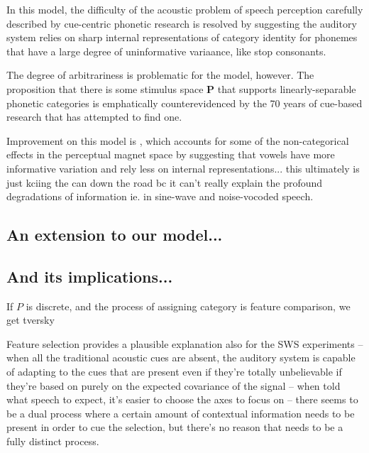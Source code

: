 \begin{multicols}{2}
In this model, the difficulty of the acoustic problem of speech perception carefully described by cue-centric phonetic research is resolved by suggesting the auditory system relies on sharp internal representations of category identity for phonemes that have a large degree of uninformative variaance, like stop consonants. 

The degree of arbitrariness is problematic for the model, however. The proposition that there is some stimulus space $\mathbf{P}$ that supports linearly-separable phonetic categories is emphatically counterevidenced by the 70 years of cue-based research that has attempted to find one. 


Improvement on this model is \cite{Kronrod2016a}, which accounts for some of the non-categorical effects in the perceptual magnet space by suggesting that vowels have more informative variation and rely less on internal representations... this ultimately is just kciing the can down the road bc it can't really explain the profound degradations of information ie. in sine-wave and noise-vocoded speech. 


\subsection{An extension to our model...}


\subsection{And its implications...}


If $P$ is discrete, and the process of assigning category is feature comparison, we get tversky


Feature selection provides a plausible explanation also for the SWS experiments -- when all the traditional acoustic cues are absent, the auditory system is capable of adapting to the cues that are present even if they're totally unbelievable if they're based on purely on the expected covariance of the signal\cite{remezSpeechPerceptionTraditional1981} -- when told what speech to expect, it's easier to choose the axes to focus on -- there seems to be a dual process where a certain amount of contextual information needs to be present in order to cue the selection, but there's no reason that needs to be a fully distinct process.


\end{multicols}
